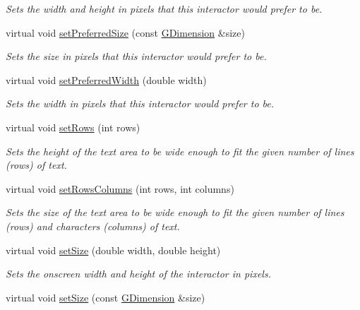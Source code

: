 \begin{DoxyCompactItemize}
\begin{DoxyCompactList}\small\item\em Sets the width and height in pixels that this interactor would prefer to be. \end{DoxyCompactList}\item 
virtual void \mbox{\hyperlink{classGInteractor_aa22d9be4bc0e078bb0ea69b0fc9d7c75}{set\+Preferred\+Size}} (const \mbox{\hyperlink{classGDimension}{G\+Dimension}} \&size)
\begin{DoxyCompactList}\small\item\em Sets the size in pixels that this interactor would prefer to be. \end{DoxyCompactList}\item 
virtual void \mbox{\hyperlink{classGInteractor_a3db429ab2fa52efd187eec0ed8cdd9f2}{set\+Preferred\+Width}} (double width)
\begin{DoxyCompactList}\small\item\em Sets the width in pixels that this interactor would prefer to be. \end{DoxyCompactList}\item 
virtual void \mbox{\hyperlink{classGTextArea_a508bbe326657af6d3add84deb4595989}{set\+Rows}} (int rows)
\begin{DoxyCompactList}\small\item\em Sets the height of the text area to be wide enough to fit the given number of lines (rows) of text. \end{DoxyCompactList}\item 
virtual void \mbox{\hyperlink{classGTextArea_a15142a18598662167760b35e58be90b1}{set\+Rows\+Columns}} (int rows, int columns)
\begin{DoxyCompactList}\small\item\em Sets the size of the text area to be wide enough to fit the given number of lines (rows) and characters (columns) of text. \end{DoxyCompactList}\item 
virtual void \mbox{\hyperlink{classGInteractor_aca25d49481f9bf5fc8f7df4c086c4ce7}{set\+Size}} (double width, double height)
\begin{DoxyCompactList}\small\item\em Sets the onscreen width and height of the interactor in pixels. \end{DoxyCompactList}\item 
virtual void \mbox{\hyperlink{classGInteractor_ae2b628228f192c2702c4ce941b2af68f}{set\+Size}} (const \mbox{\hyperlink{classGDimension}{G\+Dimension}} \&size)

\end{DoxyCompactItemize}
